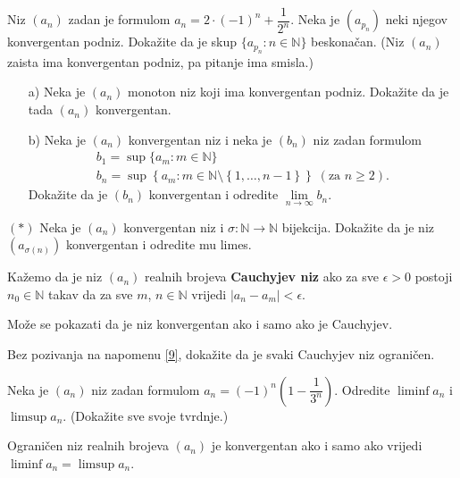 \begin{exercise}
Niz $(a_n)$ zadan je formulom $a_n=2\cdot (-1)^n+\dfrac{1}{2^n}$. Neka je $(a_{p_n})$ neki njegov konvergentan podniz. Dokažite da je skup $\{a_{p_n} : n\in \mathbb{N}\}$ beskonačan. (Niz $(a_n)$ zaista ima konvergentan podniz, pa pitanje ima smisla.)
\end{exercise}
\begin{exercise} \textbf{}
\begin{itemize}
\item[a)] Neka je $(a_n)$ monoton niz koji ima konvergentan podniz. Dokažite da je tada $(a_n)$ konvergentan.
\item[b)] Neka je $(a_n)$ konvergentan niz i neka je $(b_n)$ niz zadan formulom
\begin{gather*}
b_1=\sup\{a_m : m\in \mathbb{N}\}\\
b_n=\sup\left\{a_m : m\in \mathbb{N}\setminus\left\{1, \dots, n-1\right\}\right\}\;(\text{za }n\geq 2).
\end{gather*}
\noindent Dokažite da je $(b_n)$ konvergentan i odredite $\lim\limits_{n\to \infty}{b_n}$.
\end{itemize}
\end{exercise}
\begin{exercise} $(*)$
Neka je $(a_n)$ konvergentan niz i $\sigma : \mathbb{N}\to \mathbb{N}$ bijekcija. Dokažite da je niz $(a_{\sigma(n)})$ konvergentan i odredite mu limes.
\end{exercise}
\begin{definition}
Kažemo da je niz $(a_n)$ realnih brojeva \textbf{Cauchyjev niz} ako za sve $\epsilon>0$ postoji $n_0\in \mathbb{N}$ takav da za sve $m$, $n\in \mathbb{N}$ vrijedi $|a_n-a_m|<\epsilon$.
\end{definition}

\begin{remark}
\label{9}
Može se pokazati da je niz konvergentan ako i samo ako je Cauchyjev.
\end{remark}

\begin{exercise}
Bez pozivanja na napomenu \ref{9}, dokažite da je svaki Cauchyjev niz ograničen.
\end{exercise}
\begin{exercise}
Neka je $(a_n)$ niz zadan formulom $a_n=(-1)^n\left(1-\dfrac{1}{3^n}\right)$. Odredite $\liminf{a_n}$ i $\limsup{a_n}$. (Dokažite sve svoje tvrdnje.)
\end{exercise}
\begin{remark}
Ograničen niz realnih brojeva $(a_n)$ je konvergentan ako i samo ako vrijedi $\liminf{a_n}=\limsup{a_n}$.
\end{remark}

